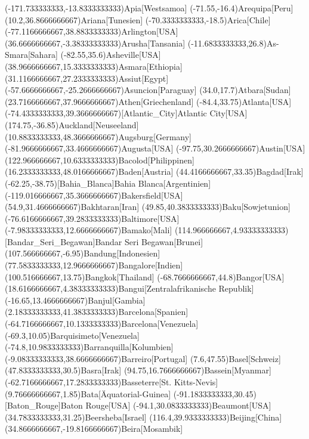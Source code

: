 \mapput(-171.733333333,-13.8333333333){Apia}[Westsamoa]
\mapput(-71.55,-16.4){Arequipa}[Peru]
\mapput(10.2,36.8666666667){Ariana}[Tunesien]
\mapput(-70.3333333333,-18.5){Arica}[Chile]
\mapput(-77.1166666667,38.8833333333){Arlington}[USA]
\mapput(36.6666666667,-3.38333333333){Arusha}[Tansania]
\mapput(-11.6833333333,26.8){As-Smara}[Sahara]
\mapput(-82.55,35.6){Asheville}[USA]
\mapput(38.9666666667,15.3333333333){Asmara}[Ethiopia]
\mapput(31.1166666667,27.2333333333){Assiut}[Egypt]
\mapput(-57.6666666667,-25.2666666667){Asuncion}[Paraguay]
\mapput(34.0,17.7){Atbara}[Sudan]
\mapput(23.7166666667,37.9666666667){Athen}[Griechenland]
\mapput(-84.4,33.75){Atlanta}[USA]
\mapput(-74.4333333333,39.3666666667)[Atlantic_City]{Atlantic City}[USA]
\mapput(174.75,-36.85){Auckland}[Neuseeland]
\mapput(10.8833333333,48.3666666667){Augsburg}[Germany]
\mapput(-81.9666666667,33.4666666667){Augusta}[USA]
\mapput(-97.75,30.2666666667){Austin}[USA]
\mapput(122.966666667,10.6333333333){Bacolod}[Philippinen]
\mapput(16.2333333333,48.0166666667){Baden}[Austria]
\mapput(44.4166666667,33.35){Bagdad}[Irak]
\mapput(-62.25,-38.75)[Bahia_Blanca]{Bahia Blanca}[Argentinien]
\mapput(-119.016666667,35.3666666667){Bakersfield}[USA]
\mapput(54.9,31.4666666667){Bakhtaran}[Iran]
\mapput(49.85,40.3833333333){Baku}[Sowjetunion]
\mapput(-76.6166666667,39.2833333333){Baltimore}[USA]
\mapput(-7.98333333333,12.6666666667){Bamako}[Mali]
\mapput(114.966666667,4.93333333333)[Bandar_Seri_Begawan]{Bandar Seri Begawan}[Brunei]
\mapput(107.566666667,-6.95){Bandung}[Indonesien]
\mapput(77.5833333333,12.9666666667){Bangalore}[Indien]
\mapput(100.516666667,13.75){Bangkok}[Thailand]
\mapput(-68.7666666667,44.8){Bangor}[USA]
\mapput(18.6166666667,4.38333333333){Bangui}[Zentralafrikanische Republik]
\mapput(-16.65,13.4666666667){Banjul}[Gambia]
\mapput(2.18333333333,41.3833333333){Barcelona}[Spanien]
\mapput(-64.7166666667,10.1333333333){Barcelona}[Venezuela]
\mapput(-69.3,10.05){Barquisimeto}[Venezuela]
\mapput(-74.8,10.9833333333){Barranquilla}[Kolumbien]
\mapput(-9.08333333333,38.6666666667){Barreiro}[Portugal]
\mapput(7.6,47.55){Basel}[Schweiz]
\mapput(47.8333333333,30.5){Basra}[Irak]
\mapput(94.75,16.7666666667){Bassein}[Myanmar]
\mapput(-62.7166666667,17.2833333333){Basseterre}[St. Kitts-Nevis]
\mapput(9.76666666667,1.85){Bata}[Äquatorial-Guinea]
\mapput(-91.1833333333,30.45)[Baton_Rouge]{Baton Rouge}[USA]
\mapput(-94.1,30.0833333333){Beaumont}[USA]
\mapput(34.7833333333,31.25){Beersheba}[Israel]
\mapput(116.4,39.9333333333){Beijing}[China]
\mapput(34.8666666667,-19.8166666667){Beira}[Mosambik]
